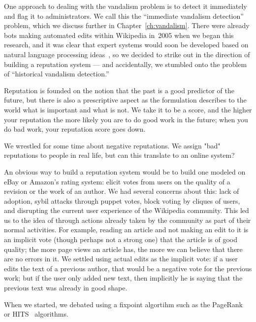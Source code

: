 One approach to dealing with the vandalism problem is to detect
it immediately and flag it to administrators.
We call this the ``immediate vandalism detection'' problem,
which we discuss further in Chapter~\ref{ch:vandalism}.
There were already bots making automated edits within Wikipedia
in~2005 when we began this research, and it was clear that
expert systems would soon be developed based on natural language processing
ideas~\cite{wiki:AntiVandalBot,wiki:MartinBot,wiki:ClueBot,Carter2007},
so we decided to strike out in the direction of building a reputation system
--- and accidentally, we stumbled onto the problem of
``historical vandalism detection.''


Reputation is founded on the notion that the past is a good
predictor of the future, but there is also a prescriptive aspect
as the formulation describes to the world what is important and
what is not.
We take it to be a score, and the higher your reputation the more
likely you are to do good work in the future; when you do bad
work, your reputation score goes down.

We wrestled for some time about negative reputations. We assign "bad"
reputations to people in real life, but can this translate to an online
system?  

An obvious way to build a reputation system would be to build one
modeled on eBay or Amazon's rating system: elicit votes from users
on the quality of a revision or the work of an author.
We had several concerns about this: lack of adoption, sybil attacks
through puppet votes, block voting by cliques of users, and
disrupting the current user experience of the Wikipedia community.
This led us to the idea of  through
actions already taken by the community as part of their normal activities.
For example, reading an article and not making an edit to it is
an implicit vote (though perhaps not a strong one)
that the article is of good quality; the more page views an article
has, the more we can believe that there are no errors in it.
We settled using actual edits as the implicit vote: if a
user edits the text of a previous author, that would be a
negative vote for the previous work; but if the user only added
new text, then implicitly he is saying that the previous text
was already in good shape.

When we started, we debated using a fixpoint algortihm
such as the PageRank~\cite{Page1999} or HITS~\cite{Kleinberg99}
algorithms.

